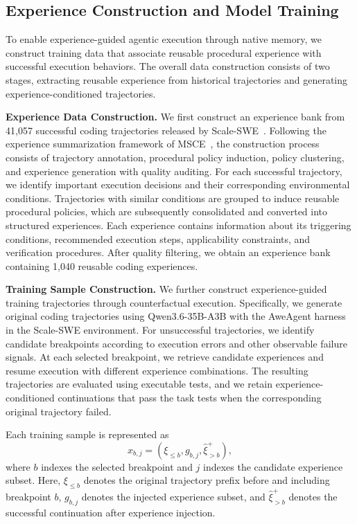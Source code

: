 \subsection{Experience Construction and Model Training}
\label{sec:app-data-training}

To enable experience-guided agentic execution through native memory, we construct training data that associate reusable procedural experience with successful execution behaviors. The overall data construction consists of two stages, extracting reusable experience from historical trajectories and generating experience-conditioned trajectories.

\textbf{Experience Data Construction.}
We first construct an experience bank from 41,057 successful coding trajectories released by Scale-SWE~\cite{zhao2026scaleswe}. Following the experience summarization framework of MSCE~\cite{tang2026msce}, the construction process consists of trajectory annotation, procedural policy induction, policy clustering, and experience generation with quality auditing. For each successful trajectory, we identify important execution decisions and their corresponding environmental conditions. Trajectories with similar conditions are grouped to induce reusable procedural policies, which are subsequently consolidated and converted into structured experiences. Each experience contains information about its triggering conditions, recommended execution steps, applicability constraints, and verification procedures. After quality filtering, we obtain an experience bank containing 1,040 reusable coding experiences.

\textbf{Training Sample Construction.}
We further construct experience-guided training trajectories through counterfactual execution. Specifically, we generate original coding trajectories using Qwen3.6-35B-A3B with the AweAgent harness~\cite{aweagent2026} in the Scale-SWE environment. For unsuccessful trajectories, we identify candidate breakpoints according to execution errors and other observable failure signals. At each selected breakpoint, we retrieve candidate experiences and resume execution with different experience combinations. The resulting trajectories are evaluated using executable tests, and we retain experience-conditioned continuations that pass the task tests when the corresponding original trajectory failed.

Each training sample is represented as
\begin{equation*}
    x_{b,j} =
    \left(
        \xi_{\leq b},
        g_{b,j},
        \hat{\xi}_{>b}^{+}
    \right),
\end{equation*}
where $b$ indexes the selected breakpoint and $j$ indexes the candidate experience subset. Here, $\xi_{\leq b}$ denotes the original trajectory prefix before and including breakpoint $b$, $g_{b,j}$ denotes the injected experience subset, and $\hat{\xi}_{>b}^{+}$ denotes the successful continuation after experience injection. 


